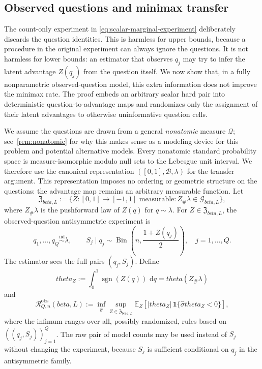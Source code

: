 \documentclass[11pt]{article}
\def\beta{beta}%
\def\theta{theta}%
\newcommand{\E}{\mathbb E}
\newcommand{\one}{\mathbf 1}
\newcommand{\sgn}{\operatorname{sgn}}
\newcommand{\Bin}{\operatorname{Bin}}
\newcommand{\calQ}{\mathcal Q}
\newcommand{\calG}{\mathcal G}
\newcommand{\calR}{\mathcal R}
\newcommand{\dd}{\,\mathrm d}
\newcommand\aed[1]{{\color{magenta!60!black} #1}}
\newcommand\ded[1]{{\color{orange!80!black} #1}}
\begin{document}
\subsection{Observed questions and minimax transfer}
\label{sec:observed-transfer}

The count-only experiment in \eqref{eq:scalar-marginal-experiment} deliberately discards the question identities.  This is harmless for upper bounds, because a procedure in the original experiment can always ignore the questions.  It is not harmless for lower bounds: an estimator that observes $q_j$ may try to infer the latent advantage $Z(q_j)$ from the question itself.  We now show that, in a fully nonparametric observed-question model, this extra information does not improve the minimax rate.  The proof embeds an arbitrary scalar hard pair into deterministic question-to-advantage maps and randomizes only the assignment of their latent advantages to otherwise uninformative question cells.

\aed{We assume the questions are drawn from a general \emph{nonatomic} measure $\calQ$; see~\cref{rem:nonatomic} for why this makes sense as a modeling device for this problem and potential alternative models.}
\ded{Every nonatomic standard probability space is measure-isomorphic modulo null sets to the Lebesgue unit interval.  We therefore use the canonical representation $([0,1],\mathcal B,\lambda)$ for the transfer argument.  This representation imposes no ordering or geometric structure on the questions: the advantage map remains an arbitrary measurable function.}  Let
\[
\mathfrak Z_{\beta,L}
:=
\{Z:[0,1]\to[-1,1]\text{ measurable}:Z_\#\lambda\in\calG_{\beta,L}\},
\]
where $Z_\#\lambda$ is the pushforward law of $Z(q)$ for $q\sim\lambda$.  For $Z\in\mathfrak Z_{\beta,L}$, the observed-question antisymmetric experiment is
\begin{equation}
\label{eq:full-observed-scalar}
q_1,\dots,q_Q\overset{\mathrm{iid}}{\sim}\lambda,
\qquad
S_j\mid q_j
\sim
\Bin\!\left(n,\frac{1+Z(q_j)}2\right),
\quad j=1,\dots,Q.
\end{equation}
The estimator sees the full pairs $(q_j,S_j)$.  Define
\[
\theta_Z
:=
\int_0^1\sgn(Z(q))\,\dd q
=
\theta(Z_\#\lambda)
\]
and
\begin{equation}
\label{eq:minimax-observed}
\calR^{\mathrm{obs}}_{Q,n}(\beta,L)
:=
\inf_{\widehat\sigma}
\sup_{Z\in\mathfrak Z_{\beta,L}}
\E_Z\!\left[
|\theta_Z|\,
\one\{\widehat\sigma\theta_Z<0\}
\right],
\end{equation}
where the infimum ranges over all, possibly randomized, rules based on $((q_j,S_j))_{j=1}^Q$.  The raw pair of model counts may be used instead of $S_j$ without changing the experiment, because $S_j$ is sufficient conditional on $q_j$ in the antisymmetric family.
\end{document}
